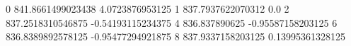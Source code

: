 0 841.8661499023438 4.0723876953125
1 837.7937622070312 0.0
2 837.2518310546875 -0.54193115234375
4 836.837890625 -0.95587158203125
6 836.8389892578125 -0.95477294921875
8 837.9337158203125 0.13995361328125
